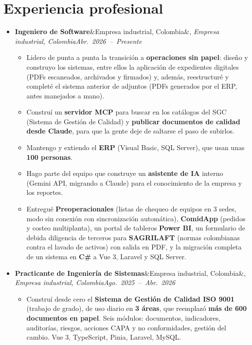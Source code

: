 \documentclass[a4paper,10pt]{article}
\newcommand{\entry}[3]{\textbf{#1}\ifx&#2&\else, \textit{#2}\fi \hfill \mbox{\textit{#3}}}
\begin{document}
\section*{Experiencia profesional}
\begin{itemize}
    \item \entry{Ingeniero de Software}{Empresa industrial, Colombia}{Abr.\ 2026 -- Presente}
        \begin{itemize}
            \item Lidero de punta a punta la transición a \textbf{operaciones sin papel}: diseño
                y construyo los sistemas, entre ellos la aplicación de expedientes digitales
                (PDFs escaneados, archivados y firmados) y, además, reestructuré y completé el
                sistema anterior de adjuntos (PDFs generados por el ERP, antes manejados a mano).
            \item Construí un \textbf{servidor MCP} para buscar en los catálogos del SGC
                (Sistema de Gestión de Calidad) y \textbf{publicar documentos de calidad desde
                Claude}, para que la gente deje de saltarse el paso de subirlos.
            \item Mantengo y extiendo el \textbf{ERP} (Visual Basic, SQL Server), que usan unas
                \textbf{100 personas}.
            \item Hago parte del equipo que construye un \textbf{asistente de IA} interno
                (Gemini API, migrando a Claude) para el conocimiento de la empresa y los reportes.
            \item Entregué \textbf{Preoperacionales} (listas de chequeo de equipos en 3 sedes,
                modo sin conexión con sincronización automática), \textbf{ComidApp} (pedidos y
                costeo multiplanta), un portal de tableros \textbf{Power BI}, un formulario de
                debida diligencia de terceros para \textbf{SAGRILAFT} (normas colombianas contra
                el lavado de activos) con salida en PDF, y la migración completa de un sistema
                en \textbf{C\#} a Vue 3, Laravel y SQL Server.
        \end{itemize}

    \item \entry{Practicante de Ingeniería de Sistemas}{Empresa industrial, Colombia}{Ago.\ 2025 -- Abr.\ 2026}
        \begin{itemize}
            \item Construí desde cero el \textbf{Sistema de Gestión de Calidad ISO 9001}
                (trabajo de grado), de uso diario en \textbf{3 áreas}, que reemplazó
                \textbf{más de 600 documentos en papel}. Seis módulos: documentos, indicadores,
                auditorías, riesgos, acciones CAPA y no conformidades, gestión del cambio.
                Vue 3, TypeScript, Pinia, Laravel, MySQL.
        \end{itemize}


\end{itemize}
\end{document}
